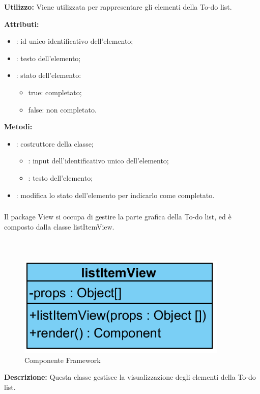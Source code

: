 \textbf{Utilizzo:}
Viene utilizzata per rappresentare gli elementi della To-do list.

\textbf{Attributi:}
\begin{itemize}
	\item {}: id unico identificativo dell'elemento;
	\item {}: testo dell'elemento;
	\item {}: stato dell'elemento: 
	\begin{itemize}
		\item true: completato;
		\item false: non completato.
	\end{itemize}
\end{itemize}

\textbf{Metodi:}
\begin{itemize}
	\item {}: costruttore della classe;
	\begin{itemize}
		\item {}: input dell'identificativo unico dell'elemento;
		\item {}: testo dell'elemento;
	\end{itemize}
	\item {}: modifica lo stato dell'elemento per indicarlo come completato.
\end{itemize}

\subsubsection[::View]{\class} \label{\class}
Il package View si occupa di gestire la parte grafica della To-do list, ed è composto dalla classe listItemView.

\subparagraph[::listItem]{\class}\mbox{}\\ \label{\class}
\begin{figure}[H]
	\centering
	\includegraphics[width=10cm]{./diagrammi/todo/list_item_view.png}
	\caption{Componente Framework}
\end{figure}
\textbf{Descrizione:}
Questa classe gestisce la visualizzazione degli elementi della To-do list.

